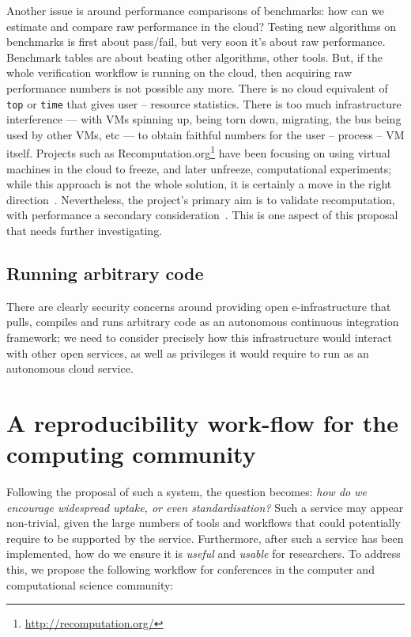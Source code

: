 \documentclass[conference]{IEEEtran}
\begin{document}
Another issue is around performance comparisons of benchmarks: how can
we estimate and compare raw performance in the cloud? Testing new
algorithms on benchmarks is first about pass/fail, but very soon it's
about raw performance. Benchmark tables are about beating other
algorithms, other tools. But, if the whole verification workflow is
running on the cloud, then acquiring raw performance numbers is not
possible any more. There is no cloud equivalent of {\texttt{top}} or
{\texttt{time}} that gives user -- resource statistics. There is too
much infrastructure interference --- with VMs spinning up, being torn
down, migrating, the bus being used by other VMs, etc --- to obtain
faithful numbers for the user -- process -- VM itself. Projects such
as Recomputation.org\footnote{\url{http://recomputation.org/}}
have been focusing on using virtual machines in the cloud to freeze,
and later unfreeze, computational experiments; while this approach is
not the whole solution, it is certainly a move in the right
direction~\cite{arabas-et-al:2014}. Nevertheless, the project's
primary aim is to validate recomputation, with performance a secondary
consideration~\cite{gent:2013}. This is one aspect of this proposal
that needs further investigating.

\subsection{Running arbitrary code}

There are clearly security concerns around providing open
e-infrastructure that pulls, compiles and runs arbitrary
code as an autonomous continuous integration framework; we need to
consider precisely how this infrastructure would interact with other
open services, as well as privileges it would require to run as an
autonomous cloud service.


\section{A reproducibility work-flow for the computing community}
\label{rollout}

Following the proposal of such a system, the question becomes:
{\emph{how do we encourage widespread uptake, or even
    standardisation?}}  Such a service may appear non-trivial, given
the large numbers of tools and workflows that could potentially
require to be supported by the service. Furthermore, after such a
service has been implemented, how do we ensure it is \emph{useful} and
\emph{usable} for researchers. To address this, we propose the
following workflow for conferences in the computer and computational
science community:
\end{document}
